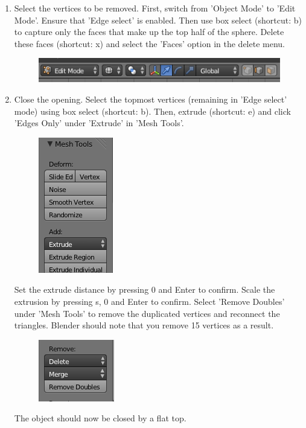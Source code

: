 \documentclass[twoside,a4paper]{refart}
\begin{document}
\begin{enumerate}
\item   Select the vertices to be removed. First, switch from 'Object Mode' to 'Edit Mode'. Ensure that 'Edge select' is enabled. Then use box select (shortcut: b) to capture only the faces that make up the top half of the sphere. Delete these faces (shortcut: x) and select the 'Faces' option in the delete menu.
        \begin{figure}[H]
        \includegraphics[scale=0.5]{spinehead3.png}
        \end{figure}

\item   Close the opening. Select the topmost vertices (remaining in 'Edge select' mode) using box select (shortcut: b). Then, extrude (shortcut: e) and click 'Edges Only' under 'Extrude' in 'Mesh Tools'.        
        \begin{figure}[H]
        \includegraphics[scale=0.5]{spinehead4.png}
        \end{figure}
        Set the extrude distance by pressing 0 and Enter to confirm. Scale the extrusion by pressing s, 0 and Enter to confirm. Select 'Remove Doubles' under 'Mesh Tools' to remove the duplicated vertices and reconnect the triangles. Blender should note that you remove 15 vertices as a result.
        \begin{figure}[H]
        \includegraphics[scale=0.5]{spinehead5.png}
        \end{figure}
        The object should now be closed by a flat top.


\end{enumerate}
\end{document}
